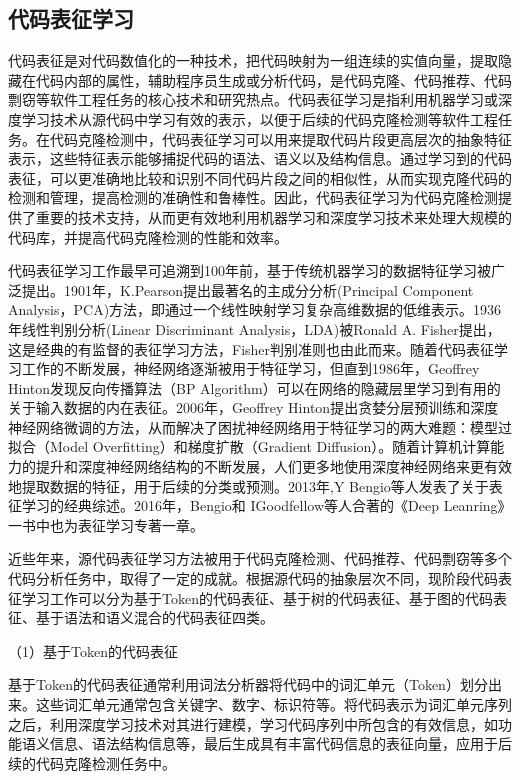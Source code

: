 \subsection{代码表征学习}
代码表征是对代码数值化的一种技术，把代码映射为一组连续的实值向量，提取隐藏在代码内部的属性，辅助程序员生成或分析代码，是代码克隆、代码推荐、代码剽窃等软件工程任务的核心技术和研究热点\cite{谢春丽_53}。代码表征学习是指利用机器学习或深度学习技术从源代码中学习有效的表示，以便于后续的代码克隆检测等软件工程任务。在代码克隆检测中，代码表征学习可以用来提取代码片段更高层次的抽象特征表示，这些特征表示能够捕捉代码的语法、语义以及结构信息。通过学习到的代码表征，可以更准确地比较和识别不同代码片段之间的相似性，从而实现克隆代码的检测和管理，提高检测的准确性和鲁棒性。因此，代码表征学习为代码克隆检测提供了重要的技术支持，从而更有效地利用机器学习和深度学习技术来处理大规模的代码库，并提高代码克隆检测的性能和效率。

代码表征学习工作最早可追溯到100年前，基于传统机器学习的数据特征学习被广泛提出。1901年，K.Pearson提出最著名的主成分分析(Principal Component Analysis，PCA)方法\cite{WOS:000202849800065}，即通过一个线性映射学习复杂高维数据的低维表示。1936年线性判别分析(Linear Discriminant Analysis，LDA)被Ronald A. Fisher提出\cite{2012THE}，这是经典的有监督的表征学习方法，Fisher判别准则也由此而来。随着代码表征学习工作的不断发展，神经网络逐渐被用于特征学习，但直到1986年，Geoffrey Hinton\cite{1986Learning}发现反向传播算法（BP Algorithm）可以在网络的隐藏层里学习到有用的关于输入数据的内在表征。2006年，Geoffrey Hinton提出贪婪分层预训练和深度神经网络微调\cite{2006A}的方法，从而解决了困扰神经网络用于特征学习的两大难题：模型过拟合（Model Overfitting）和梯度扩散（Gradient Diffusion）。随着计算机计算能力的提升和深度神经网络结构的不断发展，人们更多地使用深度神经网络来更有效地提取数据的特征，用于后续的分类或预测。2013年,Y Bengio等人发表了关于表征学习的经典综述\cite{Bengio2013Representation}。2016年，Bengio和 IGoodfellow等人合著的《Deep Leanring》一书中也为表征学习专著一章\cite{goodfellow2016deep}。

近些年来，源代码表征学习方法被用于代码克隆检测、代码推荐、代码剽窃等多个代码分析任务中，取得了一定的成就。根据源代码的抽象层次不同，现阶段代码表征学习工作可以分为基于Token的代码表征、基于树的代码表征、基于图的代码表征、基于语法和语义混合的代码表征四类。

（1）基于Token的代码表征

基于Token的代码表征通常利用词法分析器将代码中的词汇单元（Token）划分出来。这些词汇单元通常包含关键字、数字、标识符等。将代码表示为词汇单元序列之后，利用深度学习技术对其进行建模，学习代码序列中所包含的有效信息，如功能语义信息、语法结构信息等，最后生成具有丰富代码信息的表征向量，应用于后续的代码克隆检测任务中。

